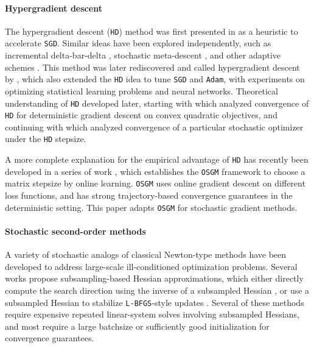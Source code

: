 \documentclass{article}
\theoremstyle{definition}
\newcommand{\os}{\texttt{OSGM}}
\newcommand{\adam}{\texttt{Adam}}
\newcommand{\sgd}{\texttt{SGD}}
\newcommand{\hd}{\texttt{HD}}
\begin{document}
\paragraph{Hypergradient descent} The hypergradient descent ({\hd}) method was first presented in \cite{almeida1999parameter} as a heuristic to accelerate {\sgd}. 
Similar ideas have been explored independently, 
such as incremental delta-bar-delta \cite{sutton1992adapting}, 
stochastic meta-descent \cite{schraudolph1999local}, 
and other adaptive schemes \cite{jacobs1988increased,mahmood2012tuning}. 
This method was later rediscovered and called hypergradient descent by \cite{baydin2018hypergradient}, 
which also extended the {\hd} idea to tune {\sgd} and {\adam}, 
with experiments on optimizing statistical learning problems and neural networks. 
Theoretical understanding of {\hd} developed later, starting with
\cite{rubio2017convergence} which analyzed convergence of {\hd} for deterministic gradient descent on convex quadratic objectives, and continuing with \cite{powerball2023} which analyzed convergence of a particular stochastic optimizer under the {\hd} stepsize.

A more complete explanation for the empirical advantage of {\hd}
has recently been developed in a series of work \cite{gao25a,chu2025provable,gao2025gradient,chu2025gradient}, 
which establishes the {\os} framework to choose a matrix stepsize by online learning.
{\os} uses online gradient descent on different loss functions, and has strong trajectory-based convergence guarantees in the deterministic setting. 
This paper adapts {\os} for stochastic gradient methods.

\paragraph{Stochastic second-order methods} 
A variety of stochastic analogs of classical Newton-type methods have been developed to address large-scale ill-conditioned optimization problems. 
Several works propose subsampling-based Hessian approximations, 
which either directly compute the search direction using the inverse of a subsampled Hessian \cite{roosta2019sub, bollapragada2019exact, derezinski2022stochastic}, 
or use a subsampled Hessian to stabilize \texttt{L-BFGS}-style updates \cite{byrd2016stochastic,moritz2016linearly, gower2016stochastic}.
Several of these methods require expensive repeated linear-system solves involving subsampled Hessians, and most require a large batchsize or sufficiently good initialization for convergence guarantees.
\end{document}
